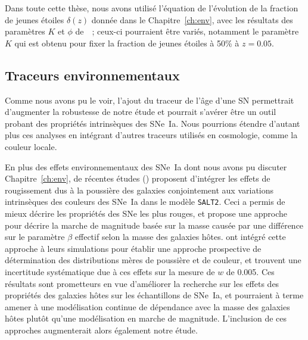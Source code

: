 \documentclass[../main/main.tex]{subfiles}
\begin{document}
Dans toute cette thèse, nous avons utilisé l'équation de l'évolution de la
fraction de jeunes étoiles $\delta(z)$ donnée dans le Chapitre~\ref{ch:env},
avec les résultats des paramètres $K$ et $\phi$ de~\cite{rigault2020}~; ceux-ci
pourraient être variés, notamment le paramètre $K$ qui est obtenu pour fixer la
fraction de jeunes étoiles à 50\% à $z = \num{0.05}$.

\subsection{Traceurs environnementaux}\label{ssec:envtrac}

Comme nous avons pu le voir, l'ajout du traceur de l'âge d'une SN permettrait
d'augmenter la robustesse de notre étude et pourrait s'avérer être un outil
probant des propriétés intrinsèques des SNe~Ia. Nous pourrions étendre d'autant
plus ces analyses en intégrant d'autres traceurs utilisés en cosmologie, comme
la couleur locale.

En plus des effets environnementaux des SNe~Ia dont nous avons pu discuter
Chapitre~\ref{ch:env}, de récentes études (\cite{brout2021}) proposent
d'intégrer les effets de rougissement dus à la poussière des galaxies
conjointement aux variations intrinsèques des couleurs des SNe~Ia dans le modèle
\texttt{SALT2}. Ceci a permis de mieux décrire les propriétés des SNe les plus
rouges, et propose une approche pour décrire la marche de magnitude basée sur la
masse causée par une différence sur le paramètre $\beta$ effectif selon la masse
des galaxies hôtes. \cite{popovic2021b} ont intégré cette approche à leurs
simulations pour établir une approche prospective de détermination des
distributions mères de poussière et de couleur, et trouvent une incertitude
systématique due à ces effets sur la mesure de $w$ de \num{0.005}. Ces résultats
sont prometteurs en vue d'améliorer la recherche sur les effets des propriétés
des galaxies hôtes sur les échantillons de SNe~Ia, et pourraient à terme amener
à une modélisation continue de dépendance avec la masse des galaxies hôtes
plutôt qu'une modélisation en marche de magnitude. L'inclusion de ces approches
augmenterait alors également notre étude.

\clearpage

\thispagestyle{plain}
\vfill
\minilof
\vfill
\minilot
\vfill


\shorthandoff{:}

\end{document}
